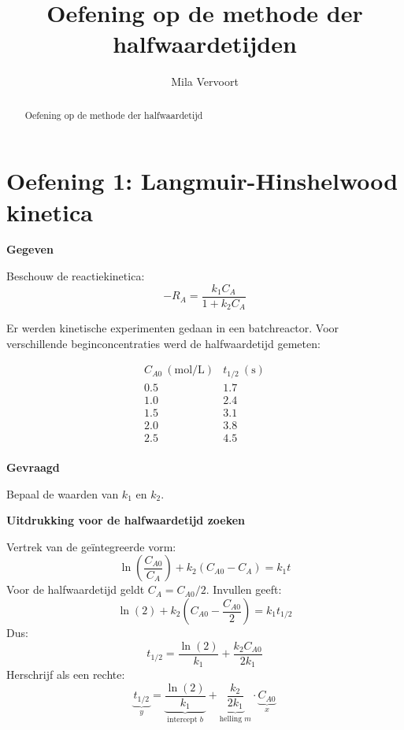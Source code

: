 \documentclass{ximera}
\title{Oefening op de methode der halfwaardetijden}
\author{Mila Vervoort}
\begin{document}
\begin{abstract}
    Oefening op de methode der halfwaardetijd
\end{abstract}
\maketitle
\label{xim:Oefening methode der halfwaardetijden}

\section*{Oefening 1: Langmuir-Hinshelwood kinetica}

\textbf{Gegeven}

Beschouw de reactiekinetica:
\[
-R_A = \frac{k_1 C_A}{1 + k_2 C_A}
\]

Er werden kinetische experimenten gedaan in een batchreactor. Voor verschillende beginconcentraties werd de halfwaardetijd gemeten:

\[
\begin{array}{c|c}
C_{A0} \ (\text{mol/L}) & t_{1/2} \ (\text{s}) \\
\hline
0.5 & 1.7 \\
1.0 & 2.4 \\
1.5 & 3.1 \\
2.0 & 3.8 \\
2.5 & 4.5 \\
\end{array}
\]

\textbf{Gevraagd}

Bepaal de waarden van $k_1$ en $k_2$.


\begin{question} \textbf{Uitdrukking voor de halfwaardetijd zoeken}

\begin{multipleChoice}
\end{multipleChoice}

\begin{feedback} \text{  }

Vertrek van de geïntegreerde vorm:
\[
\ln\left(\frac{C_{A0}}{C_A}\right) + k_2 (C_{A0} - C_A) = k_1 t
\]
Voor de halfwaardetijd geldt $C_A = C_{A0}/2$. Invullen geeft:
\[
\ln(2) + k_2 \left(C_{A0} - \frac{C_{A0}}{2}\right)
= k_1t_{1/2}
\]
Dus:
\[
t_{1/2} = \frac{\ln(2)}{k_1} + \frac{k_2 C_{A0}}{2k_1}
\]
Herschrijf als een rechte:
\[
\underbrace{t_{1/2}}_{y}
=
\underbrace{\frac{\ln(2)}{k_1}}_{\text{intercept } b}
+
\underbrace{\frac{k_2}{2k_1}}_{\text{helling } m}
\cdot
\underbrace{C_{A0}}_{x}
\]
\end{feedback}
\end{question}
\end{document}
